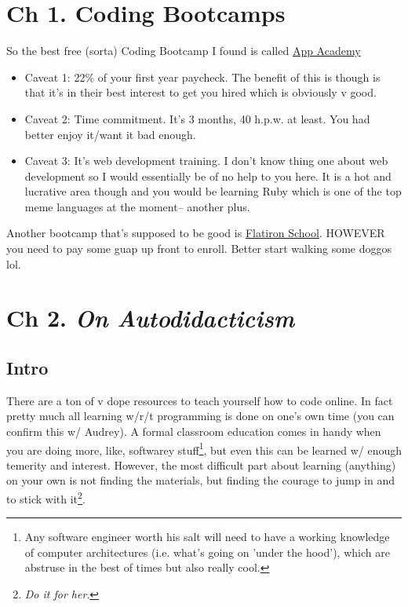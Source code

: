 \documentclass[11pt]{article}
\date{\today}
\title{}
\begin{document}
\tableofcontents

\section{Ch 1.  Coding Bootcamps}
\label{sec:orgc0aff27}

So the best free (sorta) Coding Bootcamp I found is called \href{https://www.appacademy.io/ }{App Academy } 
\begin{itemize}
\item Caveat 1: 22\% of your first year paycheck. The benefit of this is though is that it's in their best interest to get you hired which is obviously v good.
\item Caveat 2: Time commitment. It's 3 months, 40 h.p.w. at least. You had better enjoy it/want it bad enough.
\item Caveat 3: It's web development training. I don't know thing one about web development so I would essentially be of no help to you here. It is a hot and lucrative area though and you would be learning Ruby which is one of the top meme languages at the moment-- another plus.
\end{itemize}

Another bootcamp that's supposed to be good is \href{https://flatironschool.com/programs/nyc-web-developer-career-course/}{Flatiron School}. HOWEVER you need to pay some guap up front to enroll. Better start walking some doggos lol.


\section{Ch 2. \emph{On Autodidacticism}}
\label{sec:org077d857}

\subsection{Intro}
\label{sec:orgd61a98e}

There are a ton of v dope resources to teach yourself how to code online. In fact pretty much all learning w/r/t programming is done on one's own time (you can confirm this w/ Audrey). A formal classroom education comes in handy when you are doing more, like, softwarey stuff\footnote{Any software engineer worth his salt will need to have a working knowledge of computer architectures (i.e. what's going on 'under the hood'), which are abstruse in the best of times but also really cool.}, but even this can be learned w/ enough temerity and interest. However, the most difficult part about learning (anything) on your own is not finding the materials, but finding the courage to jump in and to stick with it\footnote{\emph{Do it for her}.}.
\end{document}
